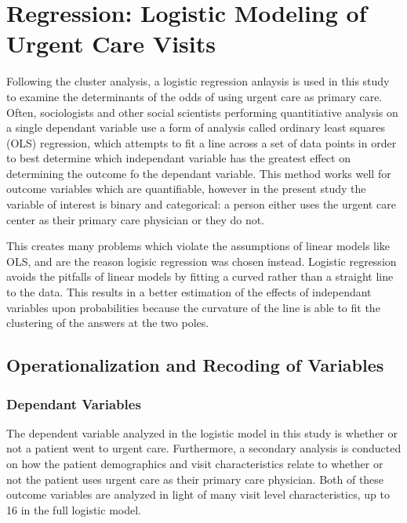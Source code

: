 \documentclass[12pt,twoside]{reedthesis}
\begin{document}
  \section*{Regression: Logistic Modeling of Urgent Care
  Visits}\label{regression-logistic-modeling-of-urgent-care-visits}
  
  \doublespacing
  
  Following the cluster analysis, a logistic regression anlaysis is used
  in this study to examine the determinants of the odds of using urgent
  care as primary care. Often, sociologists and other social scientists
  performing quantitiative analysis on a single dependant variable use a
  form of analysis called ordinary least squares (OLS) regression, which
  attempts to fit a line across a set of data points in order to best
  determine which independant variable has the greatest effect on
  determining the outcome fo the dependant variable. This method works
  well for outcome variables which are quantifiable, however in the
  present study the variable of interest is binary and categorical: a
  person either uses the urgent care center as their primary care
  physician or they do not.
  
  This creates many problems which violate the assumptions of linear
  models like OLS, and are the reason logisic regression was chosen
  instead. Logistic regression avoids the pitfalls of linear models by
  fitting a curved rather than a straight line to the data. This results
  in a better estimation of the effects of independant variables upon
  probabilities because the curvature of the line is able to fit the
  clustering of the answers at the two poles.
  
  \subsection*{Operationalization and Recoding of
  Variables}\label{operationalization-and-recoding-of-variables}
  
  \subsubsection*{Dependant Variables}\label{dependant-variables}
  
  The dependent variable analyzed in the logistic model in this study is
  whether or not a patient went to urgent care. Furthermore, a secondary
  analysis is conducted on how the patient demographics and visit
  characteristics relate to whether or not the patient uses urgent care as
  their primary care physician. Both of these outcome variables are
  analyzed in light of many visit level characteristics, up to 16 in the
  full logistic model.
  
\end{document}
